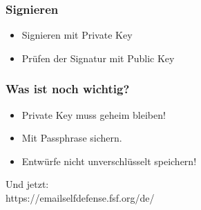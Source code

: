\documentclass[14pt]{beamer}
\begin{document}
\begin{frame}
    \frametitle{Signieren}
    \begin{itemize}
        \item Signieren mit Private Key
        \item Prüfen der Signatur mit Public Key
    \end{itemize}

\end{frame}

\begin{frame}
    \frametitle{Was ist noch wichtig?}
    \begin{itemize}
        \item Private Key muss geheim bleiben!
        \item Mit Passphrase sichern.
        \item Entwürfe nicht unverschlüsselt speichern!
    \end{itemize}

\end{frame}

\begin{frame}
    Und jetzt:\\
    \Large{https://emailselfdefense.fsf.org/de/}
\end{frame}
\end{document}

